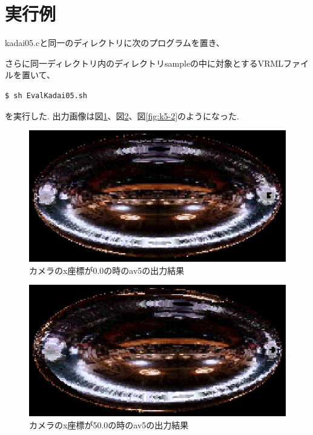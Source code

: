 \documentclass[a4j,dvipdfmx]{jsarticle}
\begin{document}
\section{実行例}
kadai05.cと同一のディレクトリに次のプログラムを置き、

さらに同一ディレクトリ内のディレクトリsampleの中に対象とするVRMLファイルを置いて、
\begin{lstlisting}
$ sh EvalKadai05.sh
\end{lstlisting}
を実行した.
出力画像は図\ref{fig:k5-0}、図\ref{fig:k5-1}、図\ref{fig:k5-2}のようになった.
\begin{figure}[hp]
  \begin{center}
    \includegraphics[clip,scale=0.5]{images/Kadai05ForAv5-0.eps}
    \caption{カメラのx座標が0.0の時のav5の出力結果}
    \label{fig:k5-0}
  \end{center}
\end{figure}
\begin{figure}[hp]
  \begin{center}
    \includegraphics[clip,scale=0.5]{images/Kadai05ForAv5-1.eps}
    \caption{カメラのx座標が50.0の時のav5の出力結果}
    \label{fig:k5-1}
  \end{center}
\end{figure}
\end{document}
